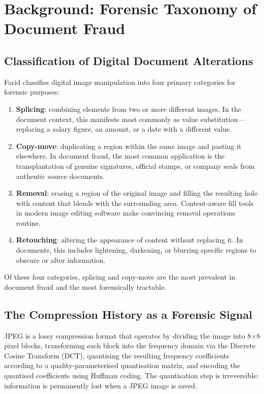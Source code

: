 \documentclass[12pt,a4paper,oneside]{report}
\begin{document}
\section{Background: Forensic Taxonomy of Document Fraud}
\label{sec:fraud_bg}

\subsection{Classification of Digital Document Alterations}

Farid \cite{farid2009} classifies digital image manipulation into four primary
categories for forensic purposes:

\begin{enumerate}

\item \textbf{Splicing}: combining elements from two or more different images.
In the document context, this manifests most commonly as value substitution---
replacing a salary figure, an amount, or a date with a different value.

\item \textbf{Copy-move}: duplicating a region within the same image and
pasting it elsewhere. In document fraud, the most common application is
the transplantation of genuine signatures, official stamps, or company
seals from authentic source documents.

\item \textbf{Removal}: erasing a region of the original image and filling
the resulting hole with content that blends with the surrounding area.
Content-aware fill tools in modern image editing software make convincing
removal operations routine.

\item \textbf{Retouching}: altering the appearance of content without
replacing it. In documents, this includes lightening, darkening, or
blurring specific regions to obscure or alter information.

\end{enumerate}

Of these four categories, splicing and copy-move are the most prevalent in
document fraud and the most forensically tractable.

\subsection{The Compression History as a Forensic Signal}

JPEG is a lossy compression format that operates by dividing the image into
8$\times$8 pixel blocks, transforming each block into the frequency domain via
the Discrete Cosine Transform (DCT), quantising the resulting frequency
coefficients according to a quality-parameterised quantisation matrix, and
encoding the quantised coefficients using Huffman coding. The quantisation step
is irreversible: information is permanently lost when a JPEG image is saved.
\end{document}
